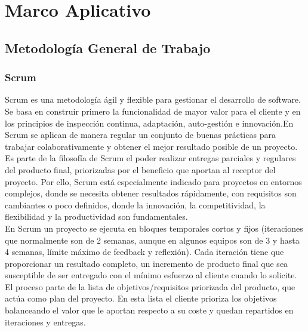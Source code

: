 
\part{Marco Aplicativo}
\chapter{Metodología General de Trabajo}

\section{Scrum}
Scrum es una metodología ágil y flexible para gestionar el desarrollo de software. Se basa en construir primero la funcionalidad de mayor valor para el cliente y en los principios de inspección continua, adaptación, auto-gestión e innovación\cite{scrumsofteng}.En Scrum se aplican de manera regular un conjunto de buenas prácticas para trabajar colaborativamente y obtener el mejor resultado posible de un proyecto.\\

Es parte de la filosofía de Scrum el poder realizar entregas parciales y regulares del producto final, priorizadas por el beneficio que aportan al receptor del proyecto. Por ello, Scrum está especialmente indicado para proyectos en entornos complejos, donde se necesita obtener resultados rápidamente, con requisitos son cambiantes o poco definidos, donde la innovación, la competitividad, la flexibilidad y la productividad son fundamentales.\\

En Scrum un proyecto se ejecuta en bloques temporales cortos y fijos (iteraciones que normalmente son de 2 semanas, aunque en algunos equipos son de 3 y hasta 4 semanas, límite máximo de feedback y reflexión). Cada iteración tiene que proporcionar un resultado completo, un incremento de producto final que sea susceptible de ser entregado con el mínimo esfuerzo al cliente cuando lo solicite. El proceso parte de la lista de objetivos/requisitos priorizada del producto, que actúa como plan del proyecto. En esta lista el cliente prioriza los objetivos balanceando el valor que le aportan respecto a su coste y quedan repartidos en iteraciones y entregas.\\  

